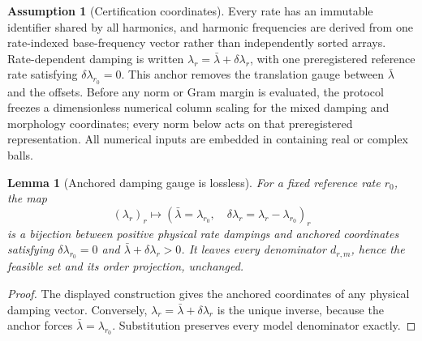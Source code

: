 \documentclass[11pt]{article}
\newtheorem{lemma}[theorem]{Lemma}
\theoremstyle{definition}
\newtheorem{assumption}[theorem]{Assumption}
\theoremstyle{remark}
\begin{document}
\begin{assumption}[Certification coordinates]
\label{ass:cert-coordinates}
Every rate has an immutable identifier shared by all harmonics, and harmonic
frequencies are derived from one rate-indexed base-frequency vector rather
than independently sorted arrays.  Rate-dependent damping is written
\(\lambda_r=\bar\lambda+\delta\lambda_r\), with one preregistered reference
rate satisfying \(\delta\lambda_{r_0}=0\).  This anchor removes the translation
gauge between \(\bar\lambda\) and the offsets.  Before any norm or Gram margin
is evaluated, the protocol freezes a dimensionless numerical column scaling
for the mixed damping and morphology coordinates; every norm below acts on
that preregistered representation.  All numerical inputs are embedded in
containing real or complex balls.
\end{assumption}

\begin{lemma}[Anchored damping gauge is lossless]
\label{lem:anchored-damping}
For a fixed reference rate \(r_0\), the map
\[
 (\lambda_r)_r\longmapsto
 \left(\bar\lambda=\lambda_{r_0},\quad
 \delta\lambda_r=\lambda_r-\lambda_{r_0}\right)_r
\]
is a bijection between positive physical rate dampings and anchored
coordinates satisfying \(\delta\lambda_{r_0}=0\) and
\(\bar\lambda+\delta\lambda_r>0\).  It leaves every denominator
\(d_{r,m}\), hence the feasible set and its order projection, unchanged.
\end{lemma}
\begin{proof}
The displayed construction gives the anchored coordinates of any physical
damping vector.  Conversely,
\(\lambda_r=\bar\lambda+\delta\lambda_r\) is the unique inverse, because the
anchor forces \(\bar\lambda=\lambda_{r_0}\).  Substitution preserves every
model denominator exactly.
\end{proof}
\end{document}
